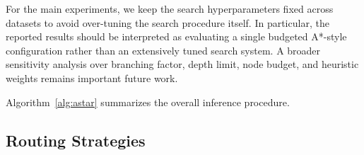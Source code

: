 \documentclass[11pt]{article}
\begin{document}



For the main experiments, we keep the search hyperparameters fixed across datasets to avoid over-tuning the search procedure itself. In particular, the reported results should be interpreted as evaluating a single budgeted A*-style configuration rather than an extensively tuned search system. A broader sensitivity analysis over branching factor, depth limit, node budget, and heuristic weights remains important future work.

Algorithm~\ref{alg:astar} summarizes the overall inference procedure.



\subsection{Routing Strategies}
\label{sec:routing}
\end{document}
